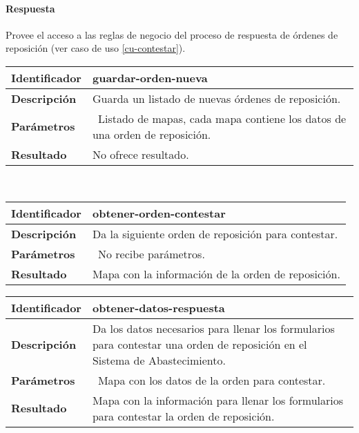 \paragraph{Respuesta\\}
Provee el acceso a las reglas de negocio del proceso de respuesta de órdenes de reposición (ver caso de uso \ref{cu-contestar}).\\
\noindent
	\begin{tabular}{|p{}|p{}|}
		\hline
		\textbf{Identificador}	& \textbf{guardar-orden-nueva}\\
		\hline
		\hline
		\textbf{Descripción}	& Guarda un listado de nuevas órdenes de reposición.\\
		\hline
		\textbf{Parámetros}		& \textbullet\, Listado de mapas, cada mapa contiene los datos de una orden de reposición.\\
		\hline
		\textbf{Resultado}		& No ofrece resultado.\\
		\hline
	\end{tabular}
	\vspace{3mm}\\
	\begin{tabular}{|p{}|p{}|}
		\hline
		\textbf{Identificador}	& \textbf{obtener-orden-contestar}\\
		\hline
		\hline
		\textbf{Descripción}	& Da la siguiente orden de reposición para contestar.\\
		\hline
		\textbf{Parámetros}		& \textbullet\, No recibe parámetros.\\
		\hline
		\textbf{Resultado}		& Mapa con la información de la orden de reposición.\\
		\hline
	\end{tabular}
	\begin{longtable}{|p{}|p{}|}
		\hline
		\textbf{Identificador}	& \textbf{obtener-datos-respuesta}\\
		\hline
		\hline
		\textbf{Descripción}	& Da los datos necesarios para llenar los formularios para contestar una orden de reposición en el Sistema de Abastecimiento.\\
		\hline
		\textbf{Parámetros}		& \textbullet\, Mapa con los datos de la orden para contestar.\\
		\hline
		\textbf{Resultado}		& Mapa con la información para llenar los formularios para contestar la orden de reposición.\\
		\hline
	\end{longtable}
